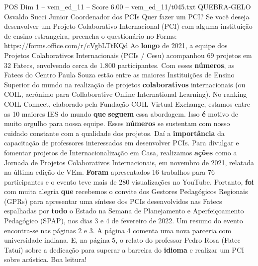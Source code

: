 \begin{textsample}{POS Dim 1 – vem\_ed\_11 – Score 6.00 – vem\_ed\_11/t045.txt}  \label{ex:f1_pos_149}
QUEBRA-GELO Osvaldo Succi Junior Coordenador dos PCIs Quer fazer um PCI?
Se você deseja desenvolver um Projeto Colaborativo Internacional (PCI) com alguma instituição de ensino estrangeira, preencha o questionário no Forms: https://forms.office.com/r/cVgbLTtKQd Ao \textbf{longo} de 2021, a equipe dos Projetos Colaborativos Internacionais (PCIs / Cesu) acompanhou 69 projetos em 32 Fatecs, envolvendo cerca de 1.800 participantes.
Com esses \textbf{números}, as Fatecs do Centro Paula Souza estão entre as maiores Instituições de Ensino Superior do mundo na realização de projetos \textbf{colaborativos} internacionais (ou COIL, acrônimo para Collaborative Online International Learning).
No ranking COIL Connect, elaborado pela Fundação COIL Virtual Exchange, estamos entre as 10 maiores IES do mundo \textbf{que} \textbf{seguem} essa abordagem.
Isso \textbf{é} motivo de muito orgulho para nossa equipe.
Esses \textbf{números} se sustentam com nosso cuidado constante com a qualidade dos projetos.
Daí a \textbf{importância} da capacitação de professores interessados em desenvolver PCIs.
Para divulgar e fomentar projetos de Internacionalização em Casa, realizamos \textbf{ações} como a Jornada de Projetos Colaborativos Internacionais, em novembro de 2021, relatada na última edição de VEm. \textbf{Foram} apresentados 16 trabalhos para 76 participantes e o evento teve mais de 280 visualizações no YouTube.
Portanto, \textbf{foi} com muita alegria \textbf{que} recebemos o convite dos Gestores Pedagógicos Regionais (GPRs) para apresentar uma síntese dos PCIs desenvolvidos nas Fatecs espalhadas por \textbf{todo} o Estado na Semana de Planejamento e Aperfeiçoamento Pedagógico (SPAP), nos dias 3 e 4 de fevereiro de 2022.
Um resumo do evento encontra-se nas páginas 2 e 3.
A página 4 comenta uma nova parceria com universidade indiana.
E, na página 5, o relato do professor Pedro Rosa (Fatec Tatuí) sobre a dedicação para superar a barreira do \textbf{idioma} e realizar um PCI sobre acústica.
Boa leitura!

\end{textsample}
